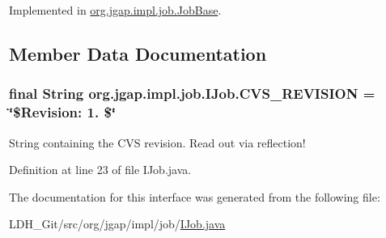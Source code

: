Implemented in \hyperlink{classorg_1_1jgap_1_1impl_1_1job_1_1_job_base_a4395288c6b1143da26fc7edb5d2bc792}{org.\-jgap.\-impl.\-job.\-Job\-Base}.



\subsection{Member Data Documentation}
\hypertarget{interfaceorg_1_1jgap_1_1impl_1_1job_1_1_i_job_a8d76655b9eddf18c2cc184cb362dd0e3}{
\subsubsection[{C\-V\-S\-\_\-\-R\-E\-V\-I\-S\-I\-O\-N}]{\setlength{\rightskip}{0pt plus 5cm}final String org.\-jgap.\-impl.\-job.\-I\-Job.\-C\-V\-S\-\_\-\-R\-E\-V\-I\-S\-I\-O\-N = \char`\"{}\$Revision\-: 1. \$\char`\"{}\hspace{0.3cm}{\ttfamily [static]}}}\label{interfaceorg_1_1jgap_1_1impl_1_1job_1_1_i_job_a8d76655b9eddf18c2cc184cb362dd0e3}
String containing the C\-V\-S revision. Read out via reflection! 

Definition at line 23 of file I\-Job.\-java.



The documentation for this interface was generated from the following file\-:\begin{DoxyCompactItemize}
\item 
L\-D\-H\-\_\-\-Git/src/org/jgap/impl/job/\hyperlink{_i_job_8java}{I\-Job.\-java}\end{DoxyCompactItemize}
